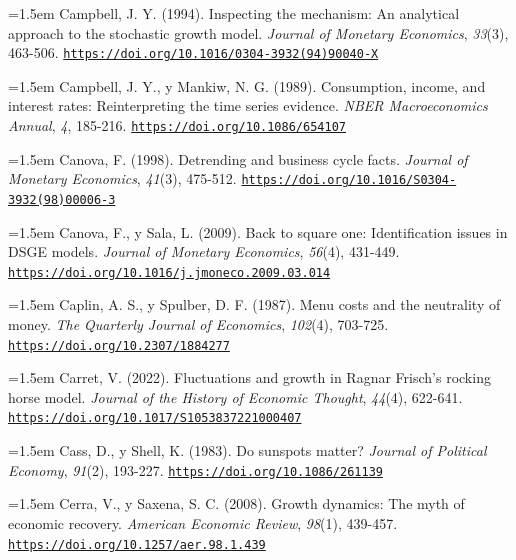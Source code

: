 \documentclass[10pt,a4paper]{article}
\begin{document}
{\sloppy\noindent\hangindent=1.5em Campbell, J. Y. (1994). Inspecting the mechanism: An analytical approach to the stochastic growth model. \textit{Journal of Monetary Economics}, \textit{33}(3), 463-506. \href{https://doi.org/10.1016/0304-3932(94)90040-X}{\nolinkurl{https://doi.org/10.1016/0304-3932(94)90040-X}}\par}

\noindent\hangindent=1.5em Campbell, J. Y., y Mankiw, N. G. (1989). Consumption, income, and interest rates: Reinterpreting the time series evidence. \textit{NBER Macroeconomics Annual}, \textit{4}, 185-216. \href{https://doi.org/10.1086/654107}{\nolinkurl{https://doi.org/10.1086/654107}}

\noindent\hangindent=1.5em Canova, F. (1998). Detrending and business cycle facts. \textit{Journal of Monetary Economics}, \textit{41}(3), 475-512. \href{https://doi.org/10.1016/S0304-3932(98)00006-3}{\nolinkurl{https://doi.org/10.1016/S0304-3932(98)00006-3}}

\noindent\hangindent=1.5em Canova, F., y Sala, L. (2009). Back to square one: Identification issues in DSGE models. \textit{Journal of Monetary Economics}, \textit{56}(4), 431-449. \href{https://doi.org/10.1016/j.jmoneco.2009.03.014}{\nolinkurl{https://doi.org/10.1016/j.jmoneco.2009.03.014}}

\noindent\hangindent=1.5em Caplin, A. S., y Spulber, D. F. (1987). Menu costs and the neutrality of money. \textit{The Quarterly Journal of Economics}, \textit{102}(4), 703-725. \href{https://doi.org/10.2307/1884277}{\nolinkurl{https://doi.org/10.2307/1884277}}

\noindent\hangindent=1.5em Carret, V. (2022). Fluctuations and growth in Ragnar Frisch's rocking horse model. \textit{Journal of the History of Economic Thought}, \textit{44}(4), 622-641. \href{https://doi.org/10.1017/S1053837221000407}{\nolinkurl{https://doi.org/10.1017/S1053837221000407}}

\noindent\hangindent=1.5em Cass, D., y Shell, K. (1983). Do sunspots matter? \textit{Journal of Political Economy}, \textit{91}(2), 193-227. \href{https://doi.org/10.1086/261139}{\nolinkurl{https://doi.org/10.1086/261139}}

\noindent\hangindent=1.5em Cerra, V., y Saxena, S. C. (2008). Growth dynamics: The myth of economic recovery. \textit{American Economic Review}, \textit{98}(1), 439-457. \href{https://doi.org/10.1257/aer.98.1.439}{\nolinkurl{https://doi.org/10.1257/aer.98.1.439}}
\end{document}
